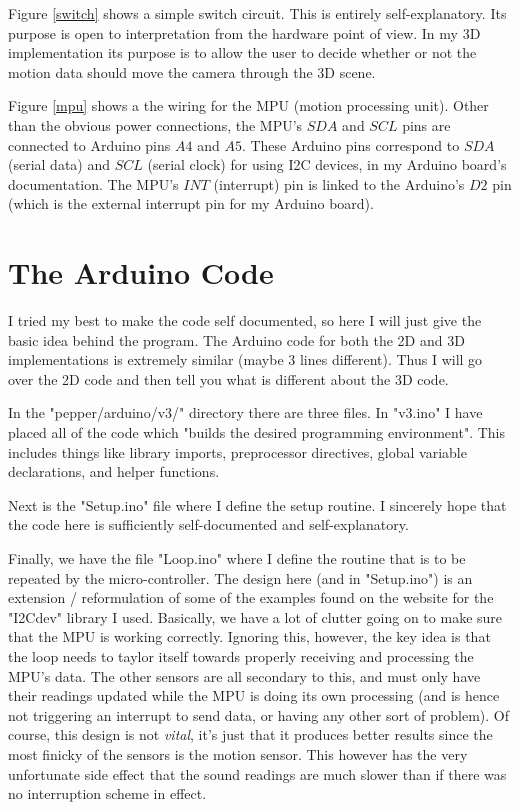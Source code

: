 \documentclass[paper=a4, fontsize=12pt]{scrartcl} 	%
\begin{document}
	Figure \ref{switch} shows a simple switch circuit.  This is entirely self-explanatory.  Its purpose is open to interpretation from the hardware point of view.  In my 3D implementation its purpose is to allow the user to decide whether or not the motion data should move the camera through the 3D scene.
	
	Figure \ref{mpu} shows a the wiring for the MPU (motion processing unit).  Other than the obvious power connections, the MPU's $SDA$ and $SCL$ pins are connected to Arduino pins $A4$ and $A5$.  These Arduino pins correspond to $SDA$ (serial data) and $SCL$ (serial clock) for using I2C devices, in my Arduino board's documentation.  The MPU's $INT$ (interrupt) pin is linked to the Arduino's $D2$ pin (which is the external interrupt pin for my Arduino board).




\section{The Arduino Code}
	I tried my best to make the code self documented, so here I will just give the basic idea behind the program.  The Arduino code for both the 2D and 3D implementations is extremely similar (maybe 3 lines different).  Thus I will go over the 2D code and then tell you what is different about the 3D code.  
	
	In the "pepper/arduino/v3/" directory there are three files.  In "v3.ino" I have placed all of the code which "builds the desired programming environment".  This includes things like library imports, preprocessor directives, global variable declarations, and helper functions.  
	
	Next is the "Setup.ino" file where I define the setup routine.  I sincerely hope that the code here is sufficiently self-documented and self-explanatory.  
	
	Finally, we have the file "Loop.ino" where I define the routine that is to be repeated by the micro-controller.  The design here (and in "Setup.ino") is an extension / reformulation of some of the examples found on the website for the "I2Cdev" library I used.  Basically, we have a lot of clutter going on to make sure that the MPU is working correctly.  Ignoring this, however, the key idea is that the loop needs to taylor itself towards properly receiving and processing the MPU's data.  The other sensors are all secondary to this, and must only have their readings updated while the MPU is doing its own processing (and is hence not triggering an interrupt to send data, or having any other sort of problem).  Of course, this design is not \emph{vital}, it's just that it produces better results since the most finicky of the sensors is the motion sensor.  This however has the very unfortunate side effect that the sound readings are much slower than if there was no interruption scheme in effect.
	
\end{document}
